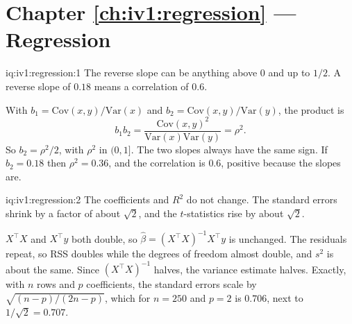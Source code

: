 \section*{Chapter \ref{ch:iv1:regression} --- Regression}

\begin{solution}{iq:iv1:regression:1}
The reverse slope can be anything above 0 and up to $1/2$. A reverse slope of $0.18$ means a correlation of $0.6$.

With $b_1 = \mathrm{Cov}(x,y)/\mathrm{Var}(x)$ and $b_2 = \mathrm{Cov}(x,y)/\mathrm{Var}(y)$, the product is
\[
b_1 b_2 = \frac{\mathrm{Cov}(x,y)^2}{\mathrm{Var}(x)\mathrm{Var}(y)} = \rho^2 .
\]
So $b_2 = \rho^2/2$, with $\rho^2$ in $(0, 1]$. The two slopes always have the same sign. If $b_2 = 0.18$ then $\rho^2 = 0.36$, and the correlation is $0.6$, positive because the slopes are.

\end{solution}

\begin{solution}{iq:iv1:regression:2}
The coefficients and $R^2$ do not change. The standard errors shrink by a factor of about $\sqrt2$, and the $t$-statistics rise by about $\sqrt2$.

$X^\top X$ and $X^\top y$ both double, so $\hat\beta = (X^\top X)^{-1}X^\top y$ is unchanged. The residuals repeat, so RSS doubles while the degrees of freedom almost double, and $s^2$ is about the same. Since $(X^\top X)^{-1}$ halves, the variance estimate halves. Exactly, with $n$ rows and $p$ coefficients, the standard errors scale by $\sqrt{(n-p)/(2n-p)}$, which for $n = 250$ and $p = 2$ is $0.706$, next to $1/\sqrt2 = 0.707$.

\end{solution}

